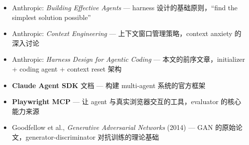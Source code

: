 \begin{itemize}[leftmargin=1.5em]
    \item Anthropic: \textit{Building Effective Agents} --- harness 设计的基础原则，``find the simplest solution possible''
    \item Anthropic: \textit{Context Engineering} --- 上下文窗口管理策略，context anxiety 的深入讨论
    \item Anthropic: \textit{Harness Design for Agentic Coding} --- 本文的前序文章，initializer + coding agent + context reset 架构
    \item \textbf{Claude Agent SDK} 文档 --- 构建 multi-agent 系统的官方框架
    \item \textbf{Playwright MCP} --- 让 agent 与真实浏览器交互的工具，evaluator 的核心能力来源
    \item Goodfellow et al., \textit{Generative Adversarial Networks} (2014) --- GAN 的原始论文，generator-discriminator 对抗训练的理论基础
\end{itemize}



